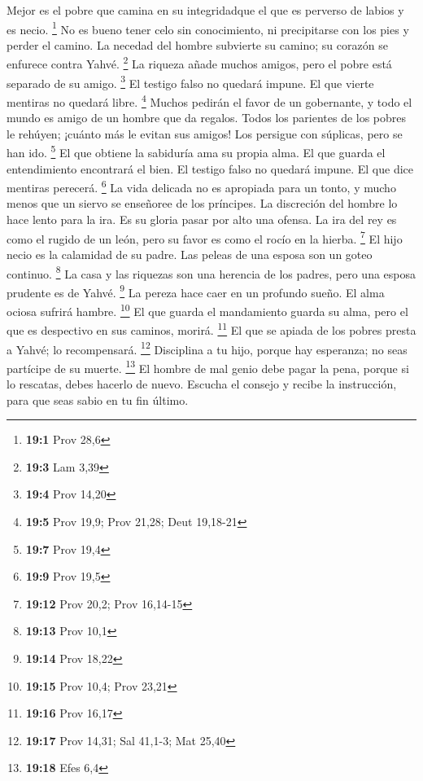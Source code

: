 \begin{paracol}{2}
 Mejor es el pobre que camina en su integridadque el que
es perverso de labios y es necio. \footnote{\textbf{19:1} Prov 28,6}
 No es bueno tener celo sin conocimiento, ni precipitarse
con los pies y perder el camino.  La necedad del hombre
subvierte su camino; su corazón se enfurece contra Yahvé. \footnote{\textbf{19:3}
  Lam 3,39}  La riqueza añade muchos amigos, pero el pobre
está separado de su amigo. \footnote{\textbf{19:4} Prov 14,20}
 El testigo falso no quedará impune. El que vierte
mentiras no quedará libre. \footnote{\textbf{19:5} Prov 19,9; Prov
  21,28; Deut 19,18-21}  Muchos pedirán el favor de un
gobernante, y todo el mundo es amigo de un hombre que da regalos.
 Todos los parientes de los pobres le rehúyen; ¡cuánto más
le evitan sus amigos! Los persigue con súplicas, pero se han ido.
\footnote{\textbf{19:7} Prov 19,4}  El que obtiene la
sabiduría ama su propia alma. El que guarda el entendimiento encontrará
el bien.  El testigo falso no quedará impune. El que dice
mentiras perecerá. \footnote{\textbf{19:9} Prov 19,5}  La
vida delicada no es apropiada para un tonto, y mucho menos que un siervo
se enseñoree de los príncipes.  La discreción del hombre
lo hace lento para la ira. Es su gloria pasar por alto una ofensa.
 La ira del rey es como el rugido de un león, pero su
favor es como el rocío en la hierba. \footnote{\textbf{19:12} Prov 20,2;
  Prov 16,14-15}  El hijo necio es la calamidad de su
padre. Las peleas de una esposa son un goteo continuo. \footnote{\textbf{19:13}
  Prov 10,1}  La casa y las riquezas son una herencia de
los padres, pero una esposa prudente es de Yahvé. \footnote{\textbf{19:14}
  Prov 18,22}  La pereza hace caer en un profundo sueño.
El alma ociosa sufrirá hambre. \footnote{\textbf{19:15} Prov 10,4; Prov
  23,21}  El que guarda el mandamiento guarda su alma,
pero el que es despectivo en sus caminos, morirá. \footnote{\textbf{19:16}
  Prov 16,17}  El que se apiada de los pobres presta a
Yahvé; lo recompensará. \footnote{\textbf{19:17} Prov 14,31; Sal 41,1-3;
  Mat 25,40}  Disciplina a tu hijo, porque hay esperanza;
no seas partícipe de su muerte. \footnote{\textbf{19:18} Efes 6,4}
 El hombre de mal genio debe pagar la pena, porque si lo
rescatas, debes hacerlo de nuevo.  Escucha el consejo y
recibe la instrucción, para que seas sabio en tu fin último.

\end{paracol}

